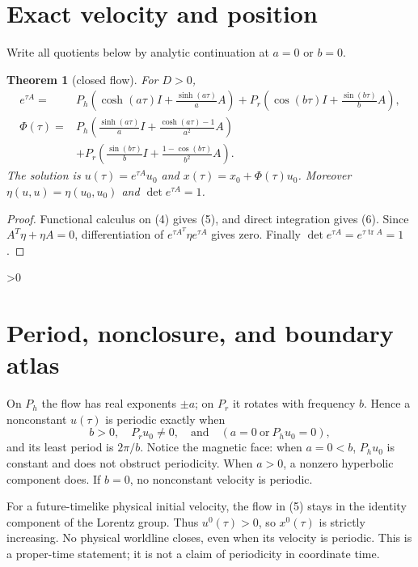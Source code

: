\documentclass[10pt]{article}
\providecommand{\CRevisionRound}{2}
\newtheorem{theorem}{Theorem}
\begin{document}
\section{Exact velocity and position}
Write all quotients below by analytic continuation at $a=0$ or $b=0$.
\begin{theorem}[closed flow]
For $D>0$,
\begin{align}
 e^{\tau A}={}&P_h\left(\cosh(a\tau)I+\frac{\sinh(a\tau)}aA\right)
 +P_r\left(\cos(b\tau)I+\frac{\sin(b\tau)}bA\right),       \tag{5}\\
 \Phi(\tau)={}&P_h\left(\frac{\sinh(a\tau)}aI+
 \frac{\cosh(a\tau)-1}{a^2}A\right)\nonumber\\
 &+P_r\left(\frac{\sin(b\tau)}bI+
 \frac{1-\cos(b\tau)}{b^2}A\right).                       \tag{6}
\end{align}
The solution is $u(\tau)=e^{\tau A}u_0$ and
$x(\tau)=x_0+\Phi(\tau)u_0$.  Moreover
$\eta(u,u)=\eta(u_0,u_0)$ and $\det e^{\tau A}=1$.
\end{theorem}
\begin{proof}
Functional calculus on (4) gives (5), and direct integration gives (6).
Since $A^T\eta+\eta A=0$, differentiation of
$e^{\tau A^T}\eta e^{\tau A}$ gives zero.  Finally
$\det e^{\tau A}=e^{\tau\operatorname{tr}A}=1$.
\end{proof}

\ifnum\CRevisionRound>0
\section{Period, nonclosure, and boundary atlas}
On $P_h$ the flow has real exponents $\pm a$; on $P_r$ it rotates with
frequency $b$.  Hence a nonconstant $u(\tau)$ is periodic exactly when
\begin{equation}
 b>0,\quad P_ru_0\ne0,\quad\text{and}\quad(a=0\ \text{or}\ P_hu_0=0), \tag{7}
\end{equation}
and its least period is $2\pi/b$.  Notice the magnetic face: when $a=0<b$,
$P_hu_0$ is constant and does not obstruct periodicity.  When $a>0$, a
nonzero hyperbolic component does.  If $b=0$, no nonconstant velocity is
periodic.

For a future-timelike physical initial velocity, the flow in (5) stays in the
identity component of the Lorentz group.  Thus $u^0(\tau)>0$, so
$x^0(\tau)$ is strictly increasing.  No physical worldline closes, even when
its velocity is periodic.  This is a proper-time statement; it is not a claim
of periodicity in coordinate time.
\end{document}
